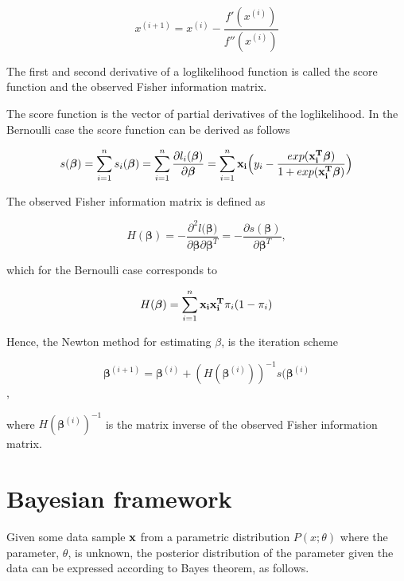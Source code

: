 \begin{equation}
    x^{(i+1)} = x^{(i)} - \frac{f'(x^{(i)})}{f''(x^{(i)})}
\end{equation}

The first and second derivative of a loglikelihood function is called the score function and the observed Fisher information matrix.

The score function is the vector of partial derivatives of the loglikelihood. In the Bernoulli case the score function can be derived as follows

\begin{equation}
\label{eq:score}
s(\bm{\beta}) = \sum_{i=1}^{n}s_i(\bm{\beta}) = \sum_{i=1}^{n} \frac{\partial l_i(\bm{\beta})}{\partial \bm{\beta}} = \sum_{i=1}^{n} {\bf x_i} \Big ( y_i - \frac{exp({\bf x_i^T} \bm{ \beta})}{1 + exp({\bf x_i^T} \bm{ \beta})}\Big )
\end{equation}

The observed Fisher information matrix is defined as 

\begin{equation}
    H(\bm {\beta}) = - \frac{\partial^2 l(\bm {\beta)}}{\partial \bm{\beta} \partial \bm{\beta}^T} = -\frac{\partial s(\bm{\beta})}{\partial \bm{\beta}^T},
\end{equation}

which for the Bernoulli case corresponds to

\begin{equation}
    H(\bm{\beta}) = \sum_{i=1}^{n} {\bf x_i x_i^T} \pi_i (1-\pi_i)
\end{equation}

Hence, the Newton method for estimating $\beta$, is the iteration scheme

\begin{equation}
\label{eq:Newton}
    \bm{\beta}^{(i+1)} = \bm{\beta}^{(i)} + (H(\bm{\beta}^{(i)}))^{-1} s(\bm{\beta}^{(i)}
\end{equation},

where $H(\bm{\beta}^{(i)})^{-1}$ is the matrix inverse of the observed Fisher information matrix.



\section{Bayesian framework}
\label{BayesianFW}

Given some data sample ${\bf x}$ from a parametric distribution $P(x;\theta)$ where the parameter, $\theta$, is unknown, the posterior distribution of the parameter given the data can be expressed according to Bayes theorem, as follows.

